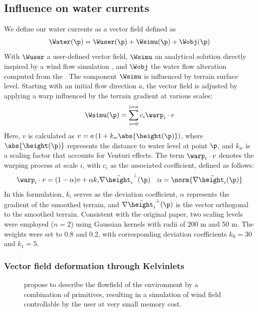 \subsection{Influence on water currents}
\label{sec:env-obj_water-currents}
We define our water currents as a vector field defined as 
\begin{align*}
    \Water(\p) = \Wuser(\p) + \Wsimu(\p) + \Wobj(\p)
\end{align*}
With $\Wuser$ a user-defined vector field, $\Wsimu$ an analytical solution directly inspired by a wind flow simulation \cite{Paris2019b}, and $\Wobj$ the water flow alteration computed from the . 
The component $\Wsimu$ is influenced by terrain surface level. Starting with an initial flow direction $a$, the vector field is adjusted by applying a warp influenced by the terrain gradient at various scales:
\begin{align*}
    \Wsimu(\p) = \sum_{i=0}^{i=n}{c_i \warp_i \cdot v}
\end{align*}
Here, $v$ is calculated as $v = a \left(1 + k_w \abs{\height(\p)} \right)$, where $\abs{\height(\p)}$ represents the distance to water level at point $\p$, and $k_w$ is a scaling factor that accounts for Venturi effects. The term $\warp_i \cdot v$ denotes the warping process at scale $i$, with $c_i$ as the associated coefficient, defined as follows:
\begin{align*}
& \warp_i \cdot v = (1 - \alpha) v + \alpha k_i \nabla \Tilde{\height_i}^{\perp}(\p) & \alpha = \norm{ \nabla \Tilde{\height_i}(\p) }
\end{align*}
In this formulation, $k_i$ serves as the deviation coefficient, $\alpha$ represents the gradient of the smoothed terrain, and $\nabla \Tilde{\height_i}^{\perp}(\p)$ is the vector orthogonal to the smoothed terrain. Consistent with the original paper, two scaling levels were employed ($n = 2$) using Gaussian kernels with radii of 200 m and 50 m. The weights were set to 0.8 and 0.2, with corresponding deviation coefficients $k_0 = 30$ and $k_1 = 5$.

\subsubsection{Vector field deformation through Kelvinlets}

\begin{figure}
    \caption{\cite{Wejchert1991} propose to describe the flowfield of the environment by a combination of primitives, resulting in a simulation of wind field controllable by the user at very small memory cost. }
    \label{fig:env-obj_wejchert-flow}
\end{figure}

